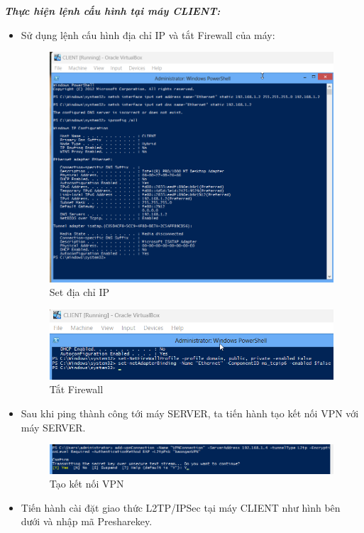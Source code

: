 \textbf{\textit{Thực hiện lệnh cấu hình tại máy CLIENT:}}
\begin{itemize}
    \item Sử dụng lệnh cấu hình địa chỉ IP và tắt Firewall của máy:

    \begin{figure}[htbp]
        \centering
        \includegraphics[width=0.5\linewidth]{coreRemoteAccess/setIPv4_CLient.png}
        \caption{Set địa chỉ IP}
    \end{figure}
    \begin{figure}[htbp]
        \centering
        \includegraphics[width=0.5\linewidth]{coreRemoteAccess/TatTuongLuaClient.png}
        \caption{Tắt Firewall}
    \end{figure}

    \newpage
    \item Sau khi ping thành công tới máy SERVER, ta tiến hành tạo kết nối VPN với máy SERVER.
    \begin{figure}[htbp]
        \centering
        \includegraphics[width=0.5\linewidth]{coreRemoteAccess/createVPNconnect.png}
        \caption{Tạo kết nối VPN}
    \end{figure}

    \item Tiến hành cài đặt giao thức L2TP/IPSec tại máy CLIENT như hình bên dưới và nhập mã Presharekey.
    

\end{itemize}
